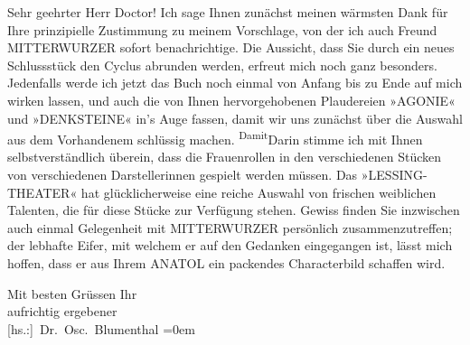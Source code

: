 \pstart\center{}Sehr geehrter Herr Doctor!\pend\vspace{0.5em}
\pstart
           Ich sage Ihnen zunächst meinen wärmsten Dank für Ihre prinzipielle Zustimmung zu
               meinem Vorschlage, von der ich auch Freund MITTERWURZER sofort benachrichtige. Die Aussicht, dass Sie durch ein neues Schlussstück den
                  Cyclus abrunden werden,
               erfreut mich noch ganz besonders. Jedenfalls werde ich jetzt das Buch noch einmal von
               Anfang bis zu Ende auf mich wirken lassen, und auch die von Ihnen hervorgehobenen
               Plaudereien »AGONIE« und »DENKSTEINE« in’s Auge fassen, damit wir uns zunächst über die Auswahl aus dem Vorhandenem
               schlüssig machen. \substVorne{}\textsuperscript{Damit}\substDazwischen{}Darin\substHinten{} stimme ich mit Ihnen selbstverständlich überein, dass die Frauenrollen in
               den verschiedenen Stücken von verschiedenen Darstellerinnen gespielt werden müssen.
               Das »LESSING-THEATER« hat glücklicherweise eine reiche Auswahl {\pb}von frischen weiblichen Talenten, die für
               diese Stücke zur Verfügung stehen. Gewiss finden Sie inzwischen auch einmal
               Gelegenheit mit MITTERWURZER persönlich zusammenzutreffen; der lebhafte Eifer, mit welchem er auf den
               Gedanken eingegangen ist, lässt mich hoffen, dass er aus Ihrem ANATOL ein packendes Characterbild schaffen wird.\pend
           
\pstart
           Mit besten Grüssen Ihr{\\[\baselineskip]} aufrichtig ergebener{\\[\baselineskip]}\spacefill\mbox{{[}hs.:{]} Dr. Osc. Blumenthal}\pend
           \leftskip=0em{}\endnumbering{}  
      